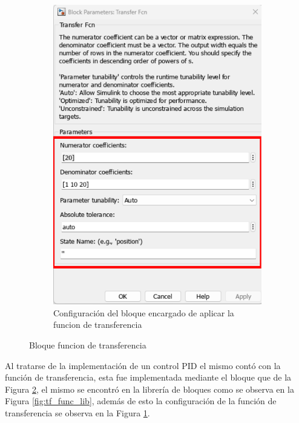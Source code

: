 \begin{figure}[htbp]
\begin{subfigure}[b]{0.45\textwidth}
        \includegraphics[width=\textwidth]{fig/Capitulo5/Caso_de_estudio_PID/config_transfer_function.pdf}
        \caption{Configuración del bloque encargado de aplicar la funcion de transferencia}
        \label{fig:tf_func_conf}
    \end{subfigure}
    \caption{Bloque funcion de transferencia}
    \label{fig:tf_func_block}
\end{figure}

Al tratarse de la implementación de un control PID el mismo contó con la función de transferencia, esta fue implementada mediante el bloque que de la Figura \ref{fig:tf_func_block}, el mismo se encontró en la librería de bloques como se observa en la Figura \ref{fig:tf_func_lib}, además de esto la configuración de la función de transferencia se observa en la Figura \ref{fig:tf_func_conf}.

